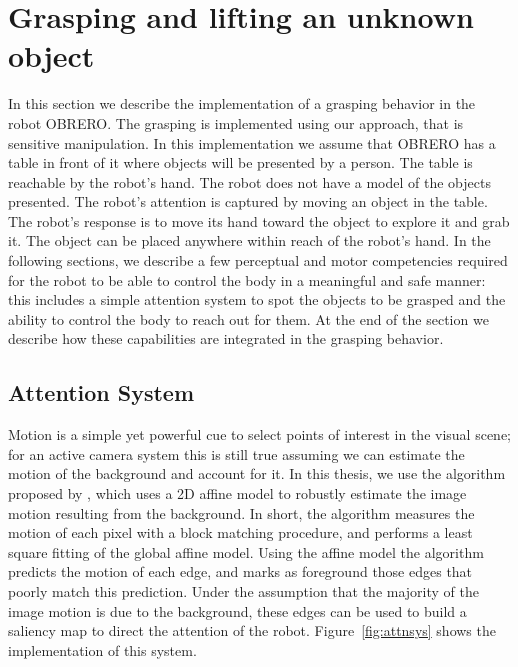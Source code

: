 \section{Grasping and lifting an unknown object}
\label{sec:controlling}
%

In this section we describe the implementation of a grasping
behavior in the robot OBRERO. The grasping is implemented using
our approach, that is sensitive manipulation.
%
In this implementation we assume that OBRERO has a table in front
of it where objects will be presented by a person. The table is
reachable by the robot's hand. The robot does not have a model of
the objects presented.
%
The robot's attention is captured by moving an object in the
table. The robot's response is to move its hand toward the object
to explore it and grab it. The object can be placed anywhere
within reach of the robot's hand.
%
In the following sections, we describe a few perceptual and motor
competencies required for the robot to be able to control the body
in a meaningful and safe manner: this includes a simple attention
system to spot the objects to be grasped and the ability to
control the body to reach out for them. At the end of the section
we describe how these capabilities are integrated in the grasping
behavior.
%
\subsection{Attention System}
\label{sec:attnsys}
%
Motion is a simple yet powerful cue to select points of interest
in the visual scene; for an active camera system this is still
true assuming we can estimate the motion of the background and
account for it. In this thesis, we use the algorithm proposed by
\cite{kemp-thesis}, which uses a 2D affine model to robustly
estimate the image motion resulting from the background. In short,
the algorithm measures the motion of each pixel with a block
matching procedure, and performs a least square fitting of the
global affine model. Using the affine model the algorithm predicts
the motion of each edge, and marks as foreground those edges that
poorly match this prediction. Under the assumption that the
majority of the image motion is due to the background, these edges
can be used to build a saliency map to direct the attention of the
robot. Figure~\ref{fig:attnsys} shows the implementation of this
system.
%

